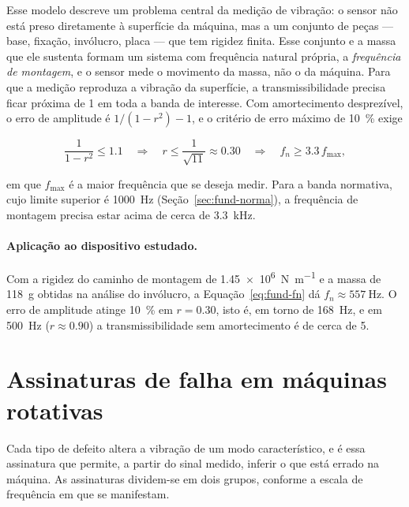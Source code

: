 Esse modelo descreve um problema central da medição de vibração: o sensor não está preso
diretamente à superfície da máquina, mas a um conjunto de peças --- base, fixação,
invólucro, placa --- que tem rigidez finita. Esse conjunto e a massa que ele sustenta
formam um sistema com frequência natural própria, a \emph{frequência de montagem}, e o
sensor mede o movimento da massa, não o da máquina. Para que a medição reproduza a
vibração da superfície, a transmissibilidade precisa ficar próxima de 1 em toda a banda de
interesse. Com amortecimento desprezível, o erro de amplitude é $1/(1-r^2) - 1$, e o
critério de erro máximo de \SI{10}{\percent} exige

\begin{equation}
\frac{1}{1-r^2} \le \num{1,1}
\quad\Longrightarrow\quad
r \le \frac{1}{\sqrt{11}} \approx \num{0,30}
\quad\Longrightarrow\quad
f_n \ge \num{3,3}\, f_{\max},
\label{eq:fund-criterio-montagem}
\end{equation}

\noindent
em que $f_{\max}$ é a maior frequência que se deseja medir. Para a banda normativa, cujo
limite superior é \SI{1000}{\hertz} (Seção~\ref{sec:fund-norma}), a frequência de
montagem precisa estar acima de cerca de \SI{3,3}{\kilo\hertz}.

\paragraph{Aplicação ao dispositivo estudado.} Com a rigidez do caminho de montagem de
\SI{1,45e6}{\newton\per\meter} e a massa de \SI{118}{\gram} obtidas na análise do
invólucro, a Equação~\eqref{eq:fund-fn} dá $f_n \approx \SI{557}{\hertz}$. O erro de
amplitude atinge \SI{10}{\percent} em $r = \num{0,30}$, isto é, em torno de
\SI{168}{\hertz}, e em \SI{500}{\hertz} ($r \approx \num{0,90}$) a transmissibilidade sem
amortecimento é de cerca de 5.

\section{Assinaturas de falha em máquinas rotativas}
\label{sec:fund-falhas}

Cada tipo de defeito altera a vibração de um modo característico, e é essa assinatura que
permite, a partir do sinal medido, inferir o que está errado na máquina. As assinaturas
dividem-se em dois grupos, conforme a escala de frequência em que se manifestam.

